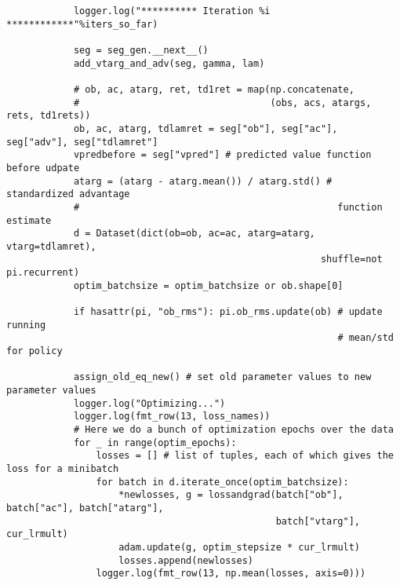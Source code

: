 \begin{verbatim}
            logger.log("********** Iteration %i ************"%iters_so_far)

            seg = seg_gen.__next__()
            add_vtarg_and_adv(seg, gamma, lam)

            # ob, ac, atarg, ret, td1ret = map(np.concatenate, 
            #                                  (obs, acs, atargs, rets, td1rets))
            ob, ac, atarg, tdlamret = seg["ob"], seg["ac"], seg["adv"], seg["tdlamret"]
            vpredbefore = seg["vpred"] # predicted value function before udpate
            atarg = (atarg - atarg.mean()) / atarg.std() # standardized advantage 
            #                                              function estimate
            d = Dataset(dict(ob=ob, ac=ac, atarg=atarg, vtarg=tdlamret), 
                                                        shuffle=not pi.recurrent)
            optim_batchsize = optim_batchsize or ob.shape[0]

            if hasattr(pi, "ob_rms"): pi.ob_rms.update(ob) # update running 
                                                           # mean/std for policy

            assign_old_eq_new() # set old parameter values to new parameter values
            logger.log("Optimizing...")
            logger.log(fmt_row(13, loss_names))
            # Here we do a bunch of optimization epochs over the data
            for _ in range(optim_epochs):
                losses = [] # list of tuples, each of which gives the loss for a minibatch
                for batch in d.iterate_once(optim_batchsize):
                    *newlosses, g = lossandgrad(batch["ob"], batch["ac"], batch["atarg"], 
                                                batch["vtarg"], cur_lrmult)
                    adam.update(g, optim_stepsize * cur_lrmult)
                    losses.append(newlosses)
                logger.log(fmt_row(13, np.mean(losses, axis=0)))


\end{verbatim}
